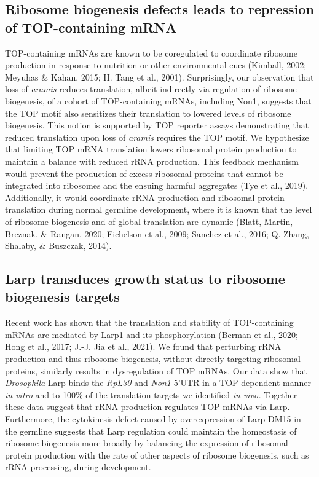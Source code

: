 \documentclass[12pt,oneside]{reedthesis}
\begin{document}
\hypertarget{ribosome-biogenesis-defects-leads-to-repression-of-top-containing-mrna}{%
\subsection{Ribosome biogenesis defects leads to repression of TOP-containing mRNA}\label{ribosome-biogenesis-defects-leads-to-repression-of-top-containing-mrna}}

TOP-containing mRNAs are known to be coregulated to coordinate ribosome production in response to nutrition or other environmental cues (Kimball, 2002; Meyuhas \& Kahan, 2015; H. Tang et al., 2001). Surprisingly, our observation that loss of \emph{aramis} reduces translation, albeit indirectly via regulation of ribosome biogenesis, of a cohort of TOP-containing mRNAs, including Non1, suggests that the TOP motif also sensitizes their translation to lowered levels of ribosome biogenesis. This notion is supported by TOP reporter assays demonstrating that reduced translation upon loss of \emph{aramis} requires the TOP motif. We hypothesize that limiting TOP mRNA translation lowers ribosomal protein production to maintain a balance with reduced rRNA production. This feedback mechanism would prevent the production of excess ribosomal proteins that cannot be integrated into ribosomes and the ensuing harmful aggregates (Tye et al., 2019). Additionally, it would coordinate rRNA production and ribosomal protein translation during normal germline development, where it is known that the level of ribosome biogenesis and of global translation are dynamic (Blatt, Martin, Breznak, \& Rangan, 2020; Fichelson et al., 2009; Sanchez et al., 2016; Q. Zhang, Shalaby, \& Buszczak, 2014).

\hypertarget{larp-transduces-growth-status-to-ribosome-biogenesis-targets}{%
\subsection{Larp transduces growth status to ribosome biogenesis targets}\label{larp-transduces-growth-status-to-ribosome-biogenesis-targets}}

Recent work has shown that the translation and stability of TOP-containing mRNAs are mediated by Larp1 and its phosphorylation (Berman et al., 2020; Hong et al., 2017; J.-J. Jia et al., 2021). We found that perturbing rRNA production and thus ribosome biogenesis, without directly targeting ribosomal proteins, similarly results in dysregulation of TOP mRNAs. Our data show that \emph{Drosophila} Larp binds the \emph{RpL30} and \emph{Non1} 5'UTR in a TOP-dependent manner \emph{in vitro} and to 100\% of the translation targets we identified \emph{in vivo.} Together these data suggest that rRNA production regulates TOP mRNAs via Larp. Furthermore, the cytokinesis defect caused by overexpression of Larp-DM15 in the germline suggests that Larp regulation could maintain the homeostasis of ribosome biogenesis more broadly by balancing the expression of ribosomal protein production with the rate of other aspects of ribosome biogenesis, such as rRNA processing, during development.
\end{document}
